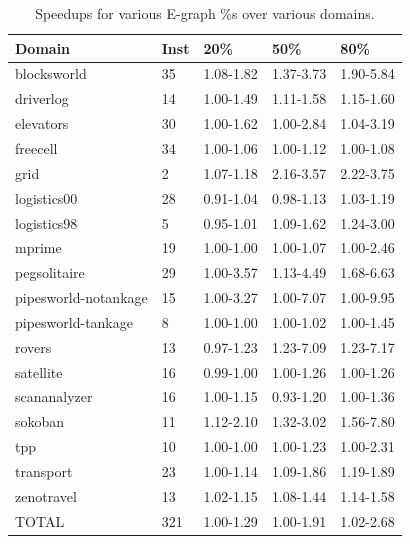 \documentclass[letterpaper]{article}
\begin{document}
\begin{table}
	\begin{center}
	    \begin{tabular}{| l | l | l | l | l |}
	    \hline
	    Domain & Inst & 20\% & 50\% & 80\%
	    \\ \hline
	    blocksworld & 35 & 1.08-1.82 & 1.37-3.73 & 1.90-5.84
	    \\ \hline
	    driverlog & 14 & 1.00-1.49 & 1.11-1.58 & 1.15-1.60
	    \\ \hline
	    elevators & 30 & 1.00-1.62 & 1.00-2.84 & 1.04-3.19
	    \\ \hline
	    freecell & 34 & 1.00-1.06 & 1.00-1.12 & 1.00-1.08
	    \\ \hline
	    grid & 2 & 1.07-1.18 & 2.16-3.57 & 2.22-3.75
	    \\ \hline
	    logistics00 & 28 & 0.91-1.04 & 0.98-1.13 & 1.03-1.19
	    \\ \hline
	    logistics98 & 5 & 0.95-1.01 & 1.09-1.62 & 1.24-3.00
	    \\ \hline
	    mprime & 19 & 1.00-1.00 & 1.00-1.07 & 1.00-2.46
	    \\ \hline
	    pegsolitaire & 29 & 1.00-3.57 & 1.13-4.49 & 1.68-6.63
	    \\ \hline
	    pipesworld-notankage & 15 & 1.00-3.27 & 1.00-7.07 & 1.00-9.95
	    \\ \hline
	    pipesworld-tankage & 8 & 1.00-1.00 & 1.00-1.02 & 1.00-1.45
	    \\ \hline
	    rovers & 13 & 0.97-1.23 & 1.23-7.09 & 1.23-7.17
	    \\ \hline
	    satellite & 16 & 0.99-1.00 & 1.00-1.26 & 1.00-1.26
	    \\ \hline
	    scananalyzer & 16 & 1.00-1.15 & 0.93-1.20 & 1.00-1.36
	    \\ \hline
	    sokoban & 11 & 1.12-2.10 & 1.32-3.02 & 1.56-7.80
	    \\ \hline
	    tpp & 10 & 1.00-1.00 & 1.00-1.23 & 1.00-2.31
	    \\ \hline
	    transport & 23 & 1.00-1.14 & 1.09-1.86 & 1.19-1.89
	    \\ \hline
	    zenotravel & 13 & 1.02-1.15 & 1.08-1.44 & 1.14-1.58
	    \\ \hline
	    TOTAL & 321 & 1.00-1.29 & 1.00-1.91 & 1.02-2.68
	    \\ \hline
	    \end{tabular}
	\end{center}
	\caption{Speedups for various E-graph \%s over various domains.}
	 \label{tab:percent}
\end{table}
\end{document}
